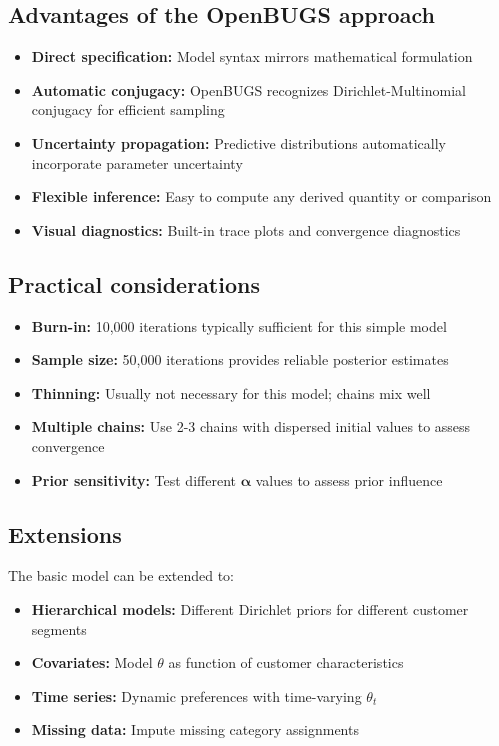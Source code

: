 \subsection{Advantages of the OpenBUGS approach}

\begin{itemize}
\item \textbf{Direct specification:} Model syntax mirrors mathematical formulation
\item \textbf{Automatic conjugacy:} OpenBUGS recognizes Dirichlet-Multinomial conjugacy for efficient sampling
\item \textbf{Uncertainty propagation:} Predictive distributions automatically incorporate parameter uncertainty
\item \textbf{Flexible inference:} Easy to compute any derived quantity or comparison
\item \textbf{Visual diagnostics:} Built-in trace plots and convergence diagnostics
\end{itemize}

\subsection{Practical considerations}

\begin{itemize}
\item \textbf{Burn-in:} 10,000 iterations typically sufficient for this simple model
\item \textbf{Sample size:} 50,000 iterations provides reliable posterior estimates
\item \textbf{Thinning:} Usually not necessary for this model; chains mix well
\item \textbf{Multiple chains:} Use 2-3 chains with dispersed initial values to assess convergence
\item \textbf{Prior sensitivity:} Test different $\boldsymbol{\alpha}$ values to assess prior influence
\end{itemize}

\subsection{Extensions}

The basic model can be extended to:
\begin{itemize}
\item \textbf{Hierarchical models:} Different Dirichlet priors for different customer segments
\item \textbf{Covariates:} Model $\theta$ as function of customer characteristics
\item \textbf{Time series:} Dynamic preferences with time-varying $\theta_t$
\item \textbf{Missing data:} Impute missing category assignments
\end{itemize}

